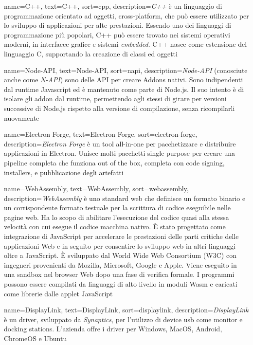 {
    name=C++,
    text=C++,
    sort=cpp,
    description={\emph{C++} è un linguaggio di programmazione orientato ad oggetti, cross-platform, che può essere utilizzato per lo sviluppo di applicazioni per alte prestazioni.
    Essendo uno dei linguaggi di programmazione più popolari, C++ può essere trovato nei sistemi operativi moderni, in interfacce grafice e sistemi \emph{embedded}.
    C++ nasce come estensione del linguaggio C, supportando la creazione di classi ed oggetti}
}

 {
    name=Node-API,
    text=Node-API,
    sort=napi,
    description={\emph{Node-API} (conosciute anche come \emph{N-API}) sono delle API per creare Addons nativi. Sono indipendenti dal runtime Javascript ed è mantenuto come parte di Node.js. Il suo intento è di isolare gli addon dal runtime, permettendo agli stessi di girare per versioni successive di Node.js rispetto alla versione di compilazione, senza ricompilarli nuovamente}
}

 {
    name=Electron Forge,
    text=Electron Forge,
    sort=electron-forge,
    description={\emph{Electron Forge} è un tool all-in-one per pacchetizzare e distribuire applicazioni in Electron. Unisce molti pacchetti single-purpose per creare una pipeline completa che funziona out of the box, completa con code signing, installers, e pubblicazione degli artefatti}
}

 {
    name=WebAssembly,
    text=WebAssembly,
    sort=webassembly,
    description={\emph{WebAssembly} è uno standard web che definisce un formato binario e un corrispondente formato testuale per la scrittura di codice eseguibile nelle pagine web. Ha lo scopo di abilitare l'esecuzione del codice quasi alla stessa velocità con cui esegue il codice macchina nativo. È stato progettato come integrazione di JavaScript per accelerare le prestazioni delle parti critiche delle applicazioni Web e in seguito per consentire lo sviluppo web in altri linguaggi oltre a JavaScript. È sviluppato dal World Wide Web Consortium (W3C) con ingegneri provenienti da Mozilla, Microsoft, Google e Apple. Viene eseguito in una sandbox nel browser Web dopo una fase di verifica formale. I programmi possono essere compilati da linguaggi di alto livello in moduli Wasm e caricati come librerie dalle applet JavaScript}
}

 {
    name=DisplayLink,
    text=DisplayLink,
    sort=displaylink,
    description={\emph{DisplayLink} è un driver, sviluppato da \emph{Synaptics}, per l'utilizzo di device usb come monitor e docking stations. L'azienda offre i driver per Windows, MacOS, Android, ChromeOS e Ubuntu}
}

